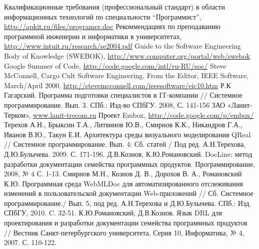 \documentclass[a5paper]{article}
\begin{document}
\begin{thebibliography}{9001}
   Квалификационные требования (профессиональный стандарт) в области информационных технологий по специальности ``Программист'', \url{http://apkit.ru/files/programer.doc}
   Рекоммендациях по преподаванию программной инженерии и информатики в университетах, \url{http://www.intuit.ru/research/se2004.pdf}
   Guide to the Software Engineering Body of Knowledge (SWEBOK), \url{http://www.computer.org/portal/web/swebok}
   Google Summer of Code, \url{http://code.google.com/intl/ru-RU/soc/}
   Steve McConnell, Cargo Cult Software Engineering. From the Editor, IEEE Software, March/April 2000, \url{http://stevemcconnell.com/ieeesoftware/eic10.htm}
   Р.К Гагарский. Программа подготовки специалистов в IT-компании // Системное программирование. Вып. 3. СПб.: Изд-во СПбГУ. 2008, С. 141-156
   ЗАО «Ланит-Терком», \url{www.lanit-trecom.ru}
   Проект Embox, \url{http://code.google.com/p/embox/}
   Терехов А.Н., Брыксин Т.А., Литвинов Ю.В., Смирнов К.К., Никандров  Г.А., Иванов В.Ю., Такун Е.И. Архитектура среды визуального  моделирования QReal // Системное программирование. Вып. 4: Сб. статей  / Под ред. А.Н.Терехова, Д.Ю.Булычева. 2009. С. 171-196.
  Д.В.Кознов, К.Ю.Романовский.  DocLine: метод разработки документации семейства программных продуктов. Программирование, 2008, № 4 С. 1-13.
  Смирнов М.Н., Кознов Д. В., Дорохов В. А., Романовский К.Ю.  Программная среда WebMLDoc для автоматизированного отслеживания изменений в пользовательской документации Web-приложений // Сб. Системное программирование./ Вып. 5, под ред. А.Н.Терехова и Д.Ю.Булычева. СПб.: Изд. СПбГУ, 2010. C. 32-51.
  К.Ю.Романовский, Д.В.Кознов. Язык DRL для проектирования и разработки документации семейства программных продуктов // Вестник Санкт-петербургского университета, Серия 10, Информатика, № 4, 2007. С. 110-122.


\end{thebibliography}
\end{document}
